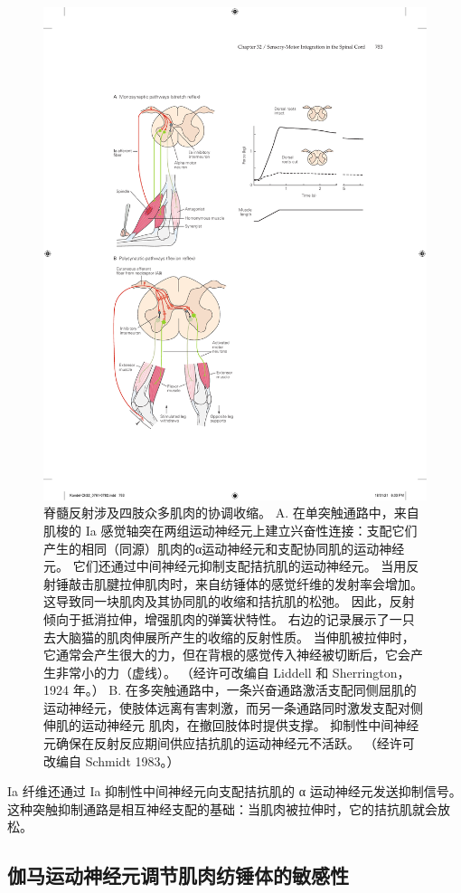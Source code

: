\begin{figure}[htbp]
	\centering
	\includegraphics[width=0.75\linewidth]{chap32/fig_32_1}
	\caption{脊髓反射涉及四肢众多肌肉的协调收缩。
		A. 在单突触通路中，来自肌梭的 Ia 感觉轴突在两组运动神经元上建立兴奋性连接：支配它们产生的相同（同源）肌肉的α运动神经元和支配协同肌的运动神经元。 
		它们还通过中间神经元抑制支配拮抗肌的运动神经元。
		当用反射锤敲击肌腱拉伸肌肉时，来自纺锤体的感觉纤维的发射率会增加。
		这导致同一块肌肉及其协同肌的收缩和拮抗肌的松弛。
		因此，反射倾向于抵消拉伸，增强肌肉的弹簧状特性。
		右边的记录展示了一只去大脑猫的肌肉伸展所产生的收缩的反射性质。 当伸肌被拉伸时，它通常会产生很大的力，但在背根的感觉传入神经被切断后，它会产生非常小的力（虚线）。 （经许可改编自 Liddell 和 Sherrington，1924 年。）
		B. 在多突触通路中，一条兴奋通路激活支配同侧屈肌的运动神经元，使肢体远离有害刺激，而另一条通路同时激发支配对侧伸肌的运动神经元 肌肉，在撤回肢体时提供支撑。
		抑制性中间神经元确保在反射反应期间供应拮抗肌的运动神经元不活跃。 （经许可改编自 Schmidt 1983。）}
	\label{fig:32_1}
\end{figure}


Ia 纤维还通过 Ia 抑制性中间神经元向支配拮抗肌的 α 运动神经元发送抑制信号。
这种突触抑制通路是相互神经支配的基础：当肌肉被拉伸时，它的拮抗肌就会放松。



\subsection{伽马运动神经元调节肌肉纺锤体的敏感性}


